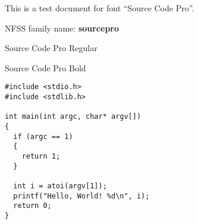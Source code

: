 \documentclass{jsarticle}
\begin{document}
{This is a test document for font ``Source Code Pro''.}

NFSS family name: {\bfseries sourcepro}

{\selectfont Source Code Pro Regular}\par
{\selectfont Source Code Pro Bold}\par

\renewcommand{\ttdefault}{sourcepro}

\begin{verbatim}
#include <stdio.h>
#include <stdlib.h>

int main(int argc, char* argv[])
{
  if (argc == 1)
  {
    return 1;
  }
  
  int i = atoi(argv[1]);
  printf("Hello, World! %d\n", i);
  return 0;
}
\end{verbatim}
\end{document}
